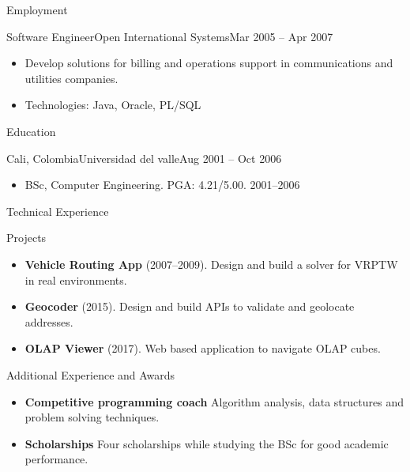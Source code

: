 \documentclass[]{mcdowellcv}
\begin{document}
\begin{cvsection}{Employment}
		\begin{cvsubsection}{Software Engineer}{Open International Systems}{Mar 2005 -- Apr 2007}	
			\begin{itemize}
				\item Develop solutions for billing and operations support in communications and utilities companies.
				\item Technologies: Java, Oracle, PL/SQL 	
			\end{itemize}
			
		\end{cvsubsection}
	\end{cvsection}
	
	\begin{cvsection}{Education}
		\begin{cvsubsection}{Cali, Colombia}{Universidad del valle}{Aug 2001 -- Oct 2006}
			\begin{itemize}
				\item BSc,	Computer	Engineering. PGA: 4.21/5.00. 2001--2006
			\end{itemize}
		\end{cvsubsection}
	\end{cvsection}
	
	\begin{cvsection}{Technical Experience}
		\begin{cvsubsection}{Projects}{}{}
			\begin{itemize}
				\item \textbf{Vehicle Routing App} (2007--2009). Design and build a solver for VRPTW in real environments.
				\item \textbf{Geocoder} (2015). Design and build APIs to validate and geolocate addresses. 
				\item \textbf{OLAP Viewer} (2017).  Web based application to navigate OLAP cubes.

			\end{itemize}
		\end{cvsubsection}
	\end{cvsection}
	
	\begin{cvsection}{Additional Experience and Awards}
		\begin{cvsubsection}{}{}{}	
			\begin{itemize}
				\item \textbf{Competitive programming coach} Algorithm analysis, data structures and problem solving techniques.
				\item \textbf{Scholarships} Four scholarships while studying the BSc for good academic performance.
			\end{itemize}
		\end{cvsubsection}
	\end{cvsection}
\end{document}

